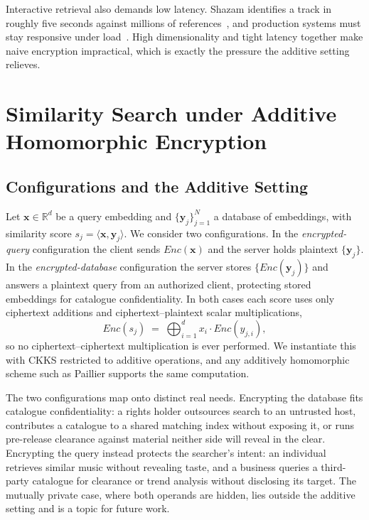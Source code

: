 \documentclass[sigconf,nonacm]{acmart}
\begin{document}
Interactive retrieval also demands low latency. Shazam identifies a track in roughly five seconds against millions of references~\cite{shazam_medium,shazam2003}, and production systems must stay responsive under load~\cite{fremerey2013music}. High dimensionality and tight latency together make naive encryption impractical, which is exactly the pressure the additive setting relieves.

\section{Similarity Search under Additive Homomorphic Encryption}
\label{sec:method}
\subsection{Configurations and the Additive Setting}
\label{subsec:configs}
Let $\mathbf{x}\in\mathbb{R}^d$ be a query embedding and $\{\mathbf{y}_j\}_{j=1}^{N}$ a database of embeddings, with similarity score $s_j=\langle\mathbf{x},\mathbf{y}_j\rangle$. We consider two configurations. In the \emph{encrypted-query} configuration the client sends $Enc(\mathbf{x})$ and the server holds plaintext $\{\mathbf{y}_j\}$. In the \emph{encrypted-database} configuration the server stores $\{Enc(\mathbf{y}_j)\}$ and answers a plaintext query from an authorized client, protecting stored embeddings for catalogue confidentiality. In both cases each score uses only ciphertext additions and ciphertext--plaintext scalar multiplications,
\[
Enc(s_j) \;=\; \bigoplus_{i=1}^{d} x_i \cdot Enc(y_{j,i}),
\]
so no ciphertext--ciphertext multiplication is ever performed. We instantiate this with CKKS restricted to additive operations, and any additively homomorphic scheme such as Paillier supports the same computation.

The two configurations map onto distinct real needs. Encrypting the database fits catalogue confidentiality: a rights holder outsources search to an untrusted host, contributes a catalogue to a shared matching index without exposing it, or runs pre-release clearance against material neither side will reveal in the clear. Encrypting the query instead protects the searcher's intent: an individual retrieves similar music without revealing taste, and a business queries a third-party catalogue for clearance or trend analysis without disclosing its target. The mutually private case, where both operands are hidden, lies outside the additive setting and is a topic for future work.
\end{document}
